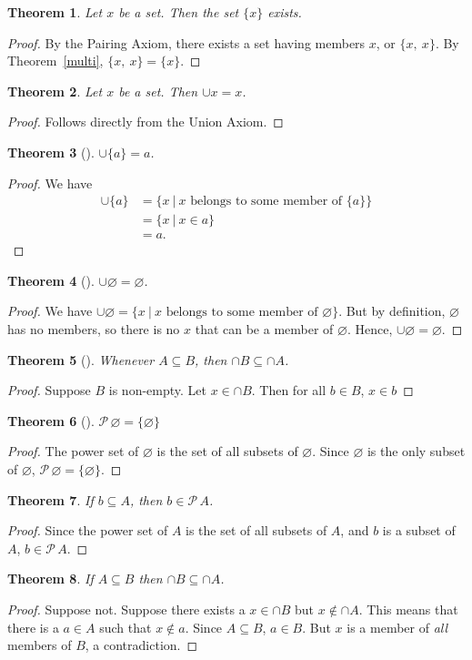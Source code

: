 \documentclass[12pt]{article}
\theoremstyle{plain}
\newtheorem{thm}{Theorem}[section]
\theoremstyle{remark}
\theoremstyle{definition}
\theoremstyle{remark}
\newcommand{\powerset}{\mathscr{P}\,}
\newcommand{\thmproof}[3]{%
 \begin{thm}[#1]
  #2
 \end{thm}
 \begin{proof}
  #3
 \end{proof}
}
\begin{document}
\begin{thm}
 Let $x$ be a set. Then the set $\{x\}$ exists.
\end{thm}
\begin{proof}
 By the Pairing Axiom, there exists a set having members $x$, or $\{x,\ x\}$. By Theorem~\ref{multi}, $\{x,\ x\} = \{x\}$.
\end{proof}

\begin{thm}
 Let $x$ be a set. Then $\cup x = x$.
\end{thm}
\begin{proof}
 Follows directly from the Union Axiom.
\end{proof}

\thmproof{}{$\cup{\{a\}} = a$.}
{We have
 \begin{align*}
  \cup{\{a\}} &= \{x\ |\ \text{$x$ belongs to some member of $\{a\}$}\}\\
              &= \{x\ |\ x \in a\}\\
              &= a.
 \end{align*}
}

\thmproof{}{$\cup \varnothing = \varnothing$.}
{We have $\cup \varnothing = \{x\ |\ \text{$x$ belongs to some member of $\varnothing$}\}$. But by definition, $\varnothing$ has no members, so there is no $x$ that can be a member of $\varnothing$. Hence, $\cup \varnothing = \varnothing$.
}

\thmproof{}{Whenever $A \subseteq B$, then $\cap B \subseteq \cap A$.}
{Suppose $B$ is non-empty. Let $x \in \cap B$. Then for all $b \in B$, $x \in b$
}

\thmproof{}{$\powerset \varnothing = \{\varnothing\}$}
{The power set of $\varnothing$ is the set of all subsets of $\varnothing$. Since $\varnothing$ is the only subset of $\varnothing$, $\powerset \varnothing = \{\varnothing \}$.
}

\begin{thm}\label{powersetMember}
 If $b \subseteq A$, then $b \in \powerset A$.
\end{thm}
\begin{proof}
 Since the power set of $A$ is the set of all subsets of $A$, and $b$ is a subset of $A$, $b \in \powerset A$.
\end{proof}

\begin{thm}
 If $A \subseteq B$ then $\cap B \subseteq \cap A$.
\end{thm}
\begin{proof}
 Suppose not. Suppose there exists a $x \in \cap B$ but $x \not\in \cap A$. This means that there is a $a \in A$ such that $x \not\in a$. Since $A \subseteq B$, $a \in B$. But $x$ is a member of \textit{all} members of $B$, a contradiction.
\end{proof}
\end{document}
